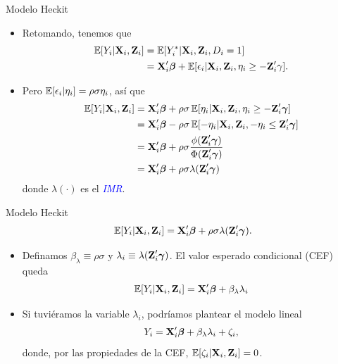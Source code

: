 \documentclass[10pt, xcolor=dvipsnames]{beamer}
\begin{document}
\begin{frame}{Modelo Heckit}
\begin{itemize}
    \item Retomando, tenemos que
    \begin{align*}
    \begin{split}
        \operatorname{\mathbb{E}}[Y_i|\textbf{X}_i,\textbf{Z}_i] &= \operatorname{\mathbb{E}}[Y^*_i|\textbf{X}_i,\textbf{Z}_i, D_i = 1] \\ 
        &= \textbf{X}'_i\boldsymbol{\beta} + \operatorname{\mathbb{E}}[\epsilon_i|\textbf{X}_i, \textbf{Z}_i, \eta_i \geq -\textbf{Z}'_i\gamma].
    \end{split}
    \end{align*}
    \item Pero $\operatorname{\mathbb{E}}[\epsilon_i|\eta_i] = \rho\sigma\eta_i$, así que 
    \begin{align*}
    \begin{split}
        \operatorname{\mathbb{E}}[Y_i|\textbf{X}_i,\textbf{Z}_i] &= \textbf{X}'_i\boldsymbol{\beta} + \rho\sigma \operatorname{\mathbb{E}}[\eta_i|\textbf{X}_i,\textbf{Z}_i, \eta_i \geq -\textbf{Z}'_i\boldsymbol{\gamma}] \\
        &= \textbf{X}'_i\boldsymbol{\beta} - \rho\sigma \operatorname{\mathbb{E}}[-\eta_i|\textbf{X}_i,\textbf{Z}_i, -\eta_i \leq \textbf{Z}'_i\boldsymbol{\gamma}] \\
        &= \textbf{X}'_i\boldsymbol{\beta} + \rho\sigma \frac{\phi(\textbf{Z}'_i\boldsymbol{\gamma})}{\Phi(\textbf{Z}'_i\boldsymbol{\gamma})} \\
        &= \textbf{X}'_i\boldsymbol{\beta} + \rho\sigma \lambda(\textbf{Z}'_i\boldsymbol{\gamma}) \\
    \end{split}
    \end{align*}
    donde $\lambda(\cdot)$ es el \textit{\textcolor{blue}{IMR}}.
\end{itemize} 
\end{frame}


\begin{frame}{Modelo Heckit}
\begin{align*}
    \operatorname{\mathbb{E}}[Y_i|\textbf{X}_i,\textbf{Z}_i] = \textbf{X}'_i\boldsymbol{\beta} + \rho\sigma \lambda(\textbf{Z}'_i\boldsymbol{\gamma}).
\end{align*}	
\begin{itemize}
    \item Definamos  $\beta_{\lambda}\equiv \rho\sigma$ y $\lambda_i \equiv \lambda(\textbf{Z}'_i\boldsymbol{\gamma})$. El valor esperado condicional (CEF) queda  
\begin{align*}
 	\operatorname{\mathbb{E}}[Y_i|\textbf{X}_i,\textbf{Z}_i] = \textbf{X}'_i\boldsymbol{\beta} + \beta_{\lambda} \lambda_i
 \end{align*}	
    \item Si tuviéramos la variable $\lambda_i$, podríamos plantear el modelo lineal   		
\begin{align*}
    Y_i = \textbf{X}'_i\boldsymbol{\beta} + \beta_{\lambda} \lambda_i  + \zeta_i,
\end{align*}
    donde, por las propiedades de la CEF, $\operatorname{\mathbb{E}}[\zeta_i|\textbf{X}_i,\textbf{Z}_i] = 0$. 
\end{itemize}
\end{frame}
\end{document}
